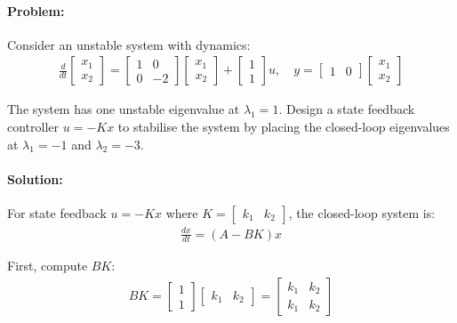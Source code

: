 \documentclass[11pt,a4paper]{article}
\begin{document}
\paragraph{Problem:} Consider an unstable system with dynamics:
\begin{align}
\frac{d}{dt}\begin{bmatrix} x_1 \\ x_2 \end{bmatrix} = \begin{bmatrix} 1 & 0 \\ 0 & -2 \end{bmatrix}\begin{bmatrix} x_1 \\ x_2 \end{bmatrix} + \begin{bmatrix} 1 \\ 1 \end{bmatrix}u, \quad y = \begin{bmatrix} 1 & 0 \end{bmatrix}\begin{bmatrix} x_1 \\ x_2 \end{bmatrix}
\end{align}

The system has one unstable eigenvalue at $\lambda_1 = 1$. Design a state feedback controller $u = -Kx$ to stabilise the system by placing the closed-loop eigenvalues at $\lambda_1 = -1$ and $\lambda_2 = -3$.

\paragraph{Solution:} 

For state feedback $u = -Kx$ where $K = \begin{bmatrix} k_1 & k_2 \end{bmatrix}$, the closed-loop system is:
\begin{align}
\frac{dx}{dt} = (A - BK)x
\end{align}

First, compute $BK$:
\begin{align}
BK = \begin{bmatrix} 1 \\ 1 \end{bmatrix}\begin{bmatrix} k_1 & k_2 \end{bmatrix} = \begin{bmatrix} k_1 & k_2 \\ k_1 & k_2 \end{bmatrix}
\end{align}
\end{document}
